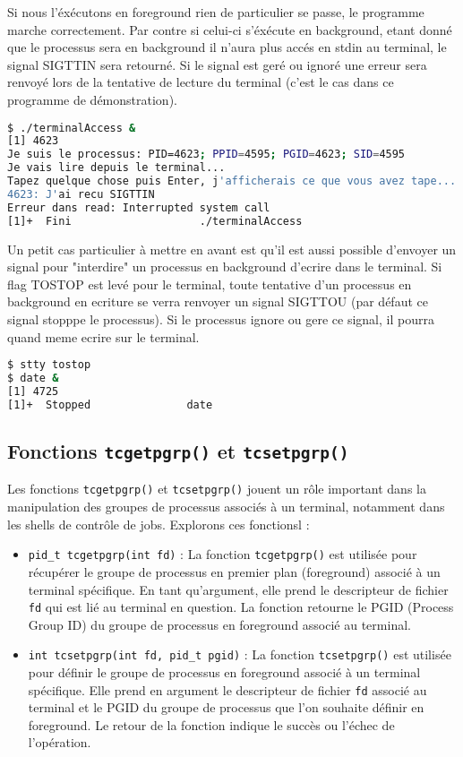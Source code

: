 Si nous l'éxécutons en foreground rien de particulier se passe, le programme marche correctement. Par contre si celui-ci s'éxécute en background, etant donné que
le processus sera en background il n'aura plus accés en stdin au terminal, le signal SIGTTIN sera retourné.
Si le signal est geré ou ignoré une erreur sera renvoyé lors de la tentative de lecture du terminal (c'est le cas dans ce programme de démonstration).

\begin{lstlisting}[language=bash]
$ ./terminalAccess &
[1] 4623
Je suis le processus: PID=4623; PPID=4595; PGID=4623; SID=4595
Je vais lire depuis le terminal...
Tapez quelque chose puis Enter, j'afficherais ce que vous avez tape...
4623: J'ai recu SIGTTIN
Erreur dans read: Interrupted system call
[1]+  Fini                    ./terminalAccess
\end{lstlisting}

Un petit cas particulier à mettre en avant est qu'il est aussi possible d'envoyer un signal pour "interdire" un processus en background d'ecrire dans le terminal. Si flag TOSTOP est levé pour
le terminal, toute tentative d'un processus en background en ecriture se verra renvoyer un signal SIGTTOU (par défaut ce signal stopppe le processus). Si le processus ignore ou gere ce signal,
il pourra quand meme ecrire sur le terminal.

\begin{lstlisting}[language=bash]
$ stty tostop
$ date &
[1] 4725
[1]+  Stopped               date
\end{lstlisting}

\subsection{Fonctions \texttt{tcgetpgrp()} et \texttt{tcsetpgrp()}}

Les fonctions \texttt{tcgetpgrp()} et \texttt{tcsetpgrp()} jouent un rôle important dans la manipulation des groupes de processus associés à un terminal, notamment dans les shells de contrôle de jobs. Explorons ces fonctionsl :

\begin{itemize}
    \item \texttt{pid\_t tcgetpgrp(int fd)} : La fonction \texttt{tcgetpgrp()} est utilisée pour récupérer le groupe de processus en premier plan (foreground) associé à un terminal spécifique. En tant qu'argument,
 elle prend le descripteur de fichier \texttt{fd} qui est lié au terminal en question. La fonction retourne le PGID (Process Group ID) du groupe de processus en foreground associé au terminal.

    \item \texttt{int tcsetpgrp(int fd, pid\_t pgid)} : La fonction \texttt{tcsetpgrp()} est utilisée pour définir le groupe de processus en foreground associé à un terminal spécifique. Elle prend en argument le descripteur de fichier \texttt{fd} associé
 au terminal et le PGID du groupe de processus que l'on souhaite définir en foreground. Le retour de la fonction indique le succès ou l'échec de l'opération.
\end{itemize}

